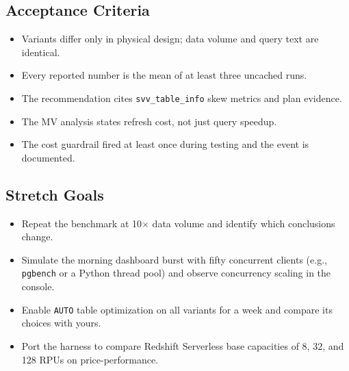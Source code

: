 \subsection*{Acceptance Criteria}
\begin{itemize}
    \item Variants differ only in physical design; data volume and query text are identical.
    \item Every reported number is the mean of at least three uncached runs.
    \item The recommendation cites \texttt{svv\_table\_info} skew metrics and plan evidence.
    \item The MV analysis states refresh cost, not just query speedup.
    \item The cost guardrail fired at least once during testing and the event is documented.
\end{itemize}

\subsection*{Stretch Goals}
\begin{itemize}
    \item Repeat the benchmark at 10$\times$ data volume and identify which conclusions change.
    \item Simulate the morning dashboard burst with fifty concurrent clients (e.g., \texttt{pgbench} or a Python thread pool) and observe concurrency scaling in the console.
    \item Enable \texttt{AUTO} table optimization on all variants for a week and compare its choices with yours.
    \item Port the harness to compare Redshift Serverless base capacities of 8, 32, and 128 RPUs on price-performance.
\end{itemize}
